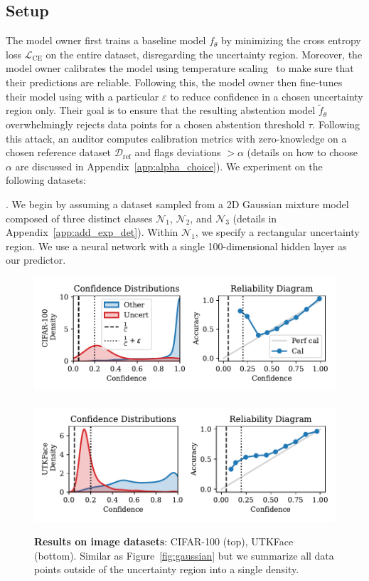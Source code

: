 \subsection{Setup}
\label{sec:exp_setup}

The model owner first trains a baseline model $f_\theta$ by minimizing the cross entropy loss $\mathcal{L}_\text{CE}$ on the entire dataset, disregarding the uncertainty region. Moreover, the model owner calibrates the model using temperature scaling~\citep{guo2017calibration} to make sure that their predictions are reliable. Following this, the model owner then fine-tunes their model using \attack with a particular $\varepsilon$ to reduce confidence in a chosen uncertainty region only. Their goal is to ensure that the resulting abstention model $\tilde{f}_\theta$ overwhelmingly rejects data points for a chosen abstention threshold $\tau$. Following this attack, an auditor computes calibration metrics with zero-knowledge on a chosen reference dataset $\mathcal{D}_\text{ref}$ and flags deviations $> \alpha$ (details on how to choose $\alpha$ are discussed in Appendix~\ref{app:alpha_choice}). We experiment on the following datasets:

. We begin by assuming a dataset sampled from a 2D Gaussian mixture model composed of three distinct classes $\mathcal{N}_1$, $\mathcal{N}_2$, and $\mathcal{N}_3$ (details in Appendix~\ref{app:add_exp_det}). Within $\mathcal{N}_1$, we specify a rectangular uncertainty region. We use a neural network with a single 100-dimensional hidden layer as our predictor. 

\begin{figure}
    \centering
    \includegraphics[width=0.48\linewidth]{figs/confidential_guardian/cifar100_res.pdf}
    ~
    \includegraphics[width=0.48\linewidth]{figs/confidential_guardian/utkface_res.pdf}
    \caption[Results on image datasets.]{\textbf{Results on image datasets}: CIFAR-100 (top), UTKFace (bottom). Similar as Figure~\ref{fig:gaussian} but we summarize all data points outside of the uncertainty region into a single density.}
    \label{fig:image}
\end{figure}

